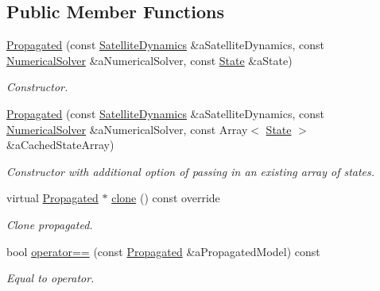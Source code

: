 \subsection*{Public Member Functions}
\begin{DoxyCompactItemize}
\item 
\hyperlink{classostk_1_1astro_1_1trajectory_1_1orbit_1_1models_1_1_propagated_a2115209c1b1167f655ff648c38b1659f}{Propagated} (const \hyperlink{classostk_1_1astro_1_1flight_1_1system_1_1dynamics_1_1_satellite_dynamics}{Satellite\+Dynamics} \&a\+Satellite\+Dynamics, const \hyperlink{classostk_1_1astro_1_1_numerical_solver}{Numerical\+Solver} \&a\+Numerical\+Solver, const \hyperlink{classostk_1_1astro_1_1trajectory_1_1_state}{State} \&a\+State)
\begin{DoxyCompactList}\small\item\em Constructor. \end{DoxyCompactList}\item 
\hyperlink{classostk_1_1astro_1_1trajectory_1_1orbit_1_1models_1_1_propagated_a58c26549679d4e20c45e3092ad549d4a}{Propagated} (const \hyperlink{classostk_1_1astro_1_1flight_1_1system_1_1dynamics_1_1_satellite_dynamics}{Satellite\+Dynamics} \&a\+Satellite\+Dynamics, const \hyperlink{classostk_1_1astro_1_1_numerical_solver}{Numerical\+Solver} \&a\+Numerical\+Solver, const Array$<$ \hyperlink{classostk_1_1astro_1_1trajectory_1_1_state}{State} $>$ \&a\+Cached\+State\+Array)
\begin{DoxyCompactList}\small\item\em Constructor with additional option of passing in an existing array of states. \end{DoxyCompactList}\item 
virtual \hyperlink{classostk_1_1astro_1_1trajectory_1_1orbit_1_1models_1_1_propagated}{Propagated} $\ast$ \hyperlink{classostk_1_1astro_1_1trajectory_1_1orbit_1_1models_1_1_propagated_a283639d985495c05adb9e80edb91cd12}{clone} () const override
\begin{DoxyCompactList}\small\item\em Clone propagated. \end{DoxyCompactList}\item 
bool \hyperlink{classostk_1_1astro_1_1trajectory_1_1orbit_1_1models_1_1_propagated_a88777b83d939ca894a20af525db347b8}{operator==} (const \hyperlink{classostk_1_1astro_1_1trajectory_1_1orbit_1_1models_1_1_propagated}{Propagated} \&a\+Propagated\+Model) const
\begin{DoxyCompactList}\small\item\em Equal to operator. \end{DoxyCompactList}\item 

\end{DoxyCompactItemize}

